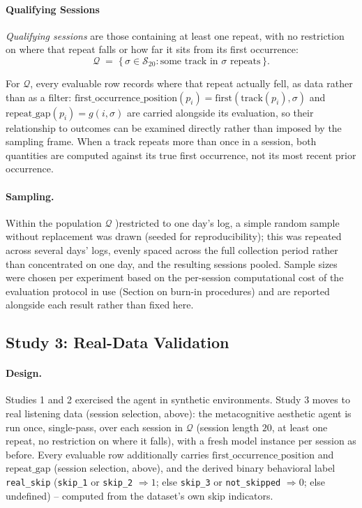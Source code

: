 \documentclass[letterpaper]{article} %
\begin{document}
\paragraph{Qualifying Sessions}
\emph{Qualifying sessions} are those containing at least one repeat, with no restriction on
where that repeat falls or how far it sits from its first occurrence:
\[
\mathcal Q \;=\; \{\, \sigma \in \mathcal S_{20} : \text{some track in }
\sigma \text{ repeats} \,\}.
\]

For $\mathcal Q$, every evaluable row 
records where that repeat actually fell, as data rather than as a filter:
$\mathrm{first\_occurrence\_position}(p_i) = \mathrm{first}(\mathrm{track}(p_i),\sigma)$
and $\mathrm{repeat\_gap}(p_i) = g(i,\sigma)$ are carried alongside its
evaluation, so their relationship to outcomes can be examined directly rather
than imposed by the sampling frame. When a track repeats more than once in a
session, both quantities are computed against its true first occurrence, not
its most recent prior occurrence.

\paragraph{Sampling.}
Within the population $\mathcal Q$ )restricted to one
day's log, a simple random sample without
replacement was drawn (seeded for reproducibility); this was repeated across
several days' logs, evenly spaced across the full collection period rather
than concentrated on one day, and the resulting sessions pooled. Sample sizes
were chosen per experiment based on the per-session computational cost of the
evaluation protocol in use (Section on burn-in procedures) and are reported
alongside each result rather than fixed here.

\subsection*{Study 3: Real-Data Validation}

\paragraph{Design.}
Studies 1 and 2 exercised the agent in synthetic environments. Study 3 moves
to real listening data (session selection, above): the metacognitive aesthetic agent is
run once, single-pass, over each session in $\mathcal Q$ (session length
$20$, at least one repeat, no restriction on where it falls), with a fresh
model instance per session as before. Every evaluable row additionally
carries $\mathrm{first\_occurrence\_position}$ and $\mathrm{repeat\_gap}$
(session selection, above), and the derived binary behavioral label
\texttt{real\_skip} (\texttt{skip\_1} or \texttt{skip\_2}
$\Rightarrow 1$; else \texttt{skip\_3} or \texttt{not\_skipped}
$\Rightarrow 0$; else undefined) -- computed from the dataset's own skip
indicators.
\end{document}
